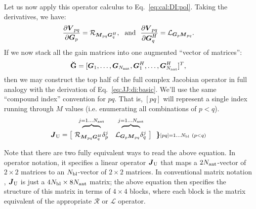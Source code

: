 \documentclass[useAMS,usenatbib]{mn2e}
\newcommand{\mat}[1]{{\bmath{#1}}}
\newcommand{\JJ}{\mat{J}} %
\newcommand{\MM}{\mat{M}}
\newcommand{\VV}{\mat{V}}
\newcommand{\GG}{\mat{G}}
\newcommand{\AUGx}[1]{\mathbf{\breve{#1}}}
\newcommand{\GGg}{\AUGx{G}}
\newcommand{\TOP}{\mathrm{U}}%
\newcommand{\Rop}[1]{\mathcal{R}_{{#1}}}
\newcommand{\Lop}[1]{\mathcal{L}_{{#1}}}
\numberwithin{equation}{section}
\providecommand{\DIFadd}[1]{{\protect\color{blue}\uwave{#1}}} %
\providecommand{\DIFaddbegin}{} %
\providecommand{\DIFaddend}{} %
\begin{document}
Let us now apply this operator calculus to Eq.~\ref{eq:cal:DI:pol}. Taking the derivatives, we have:
\begin{equation}
\label{eq:dR:dG}
\frac{\partial\VV_{pq}}{\partial\GG_p} = \Rop{\MM_{pq}\GG^H_q},\mathrm{~~and~~}
\frac{\partial\VV_{pq}}{\partial\GG^H_q} = \Lop{\GG_p \MM_{pq}}.
\end{equation}
If we now stack all the gain matrices into one augmented ``vector of matrices'':
\begin{equation}
\label{eq:GGvec}
\GGg = [ \GG_1,\dots,\GG_{\scriptstyle \Na},\GG^H_1,\dots,\GG^H_{\scriptstyle \Na} ]^T,
\end{equation}
then we may construct the top half of the full complex Jacobian operator in full analogy with the 
derivation of Eq.~\ref{eq:JJ:di:basic}. We'll use the same ``compound index'' convention for $pq$. That is, 
$[pq]$ will represent a single index running through $M$ values (i.e. enumerating all combinations of $p<q$).
\begin{equation}
\label{eq:JJtop}
\begin{array}{r@{~}cc@{~}cc}
  & \overbrace{~~~~~~~~}^{j=1\dots \Na} & \overbrace{~~~~~~~~}^{j=1\dots \Na} \\

\JJ_\TOP = \big [ & 
\Rop{ \MM_{pq}\GG^H_q }\delta^j_p & 
\Lop{ \GG_p \MM_{pq}  }\delta^j_q 
& \big ] ~~ \bm{\}} \DIFaddend \scriptstyle [pq]=1\dots \Nbl~(p<q)
% 
\end{array}
\end{equation}

Note that there are two fully equivalent ways to read the above equation. In operator notation, it specifies a linear 
operator $\JJ_\TOP$ that maps a $2N_\mathrm{ant}$-vector of $2\times2$ matrices to an $N_\mathrm{bl}$-vector of $2\times2$ matrices. In
conventional matrix notation \DIFaddbegin \DIFadd{(Appendix~\ref{sec:opcalculus})}\DIFaddend , $\JJ_\TOP$ is just a $4N_\mathrm{bl}\times8N_\mathrm{ant}$ matrix; 
the above equation then specifies the structure of this matrix in terms of $4\times4$ blocks, where each block 
is the matrix equivalent of the appropriate $\mathcal{R}$ or $\mathcal{L}$ operator.
\end{document}
